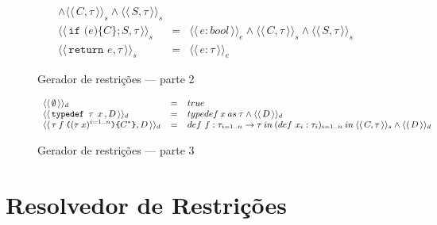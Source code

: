 \documentclass[a4paper,8pt]{article}
\newcommand{\constre}[1]{\ensuremath{\langle\langle\,#1\,\rangle\rangle_{e}}}
\newcommand{\constrc}[1]{\ensuremath{\langle\langle\,#1\,\rangle\rangle_{s}}}
\newcommand{\constrd}[1]{\ensuremath{\langle\langle\,#1\,\rangle\rangle_{d}}}
\begin{document}
\begin{figure}[h]
\[{\begin{array}{lcl}
                                                     \land
                                                     \constrc{C
                                                            , \tau}
                                                                \land \constrc{S,\tau}\\
             \constrc{\texttt{if (} e \texttt{)\{} C
             \texttt{\}} ; S , \tau} & = & \constre{e : bool}
                                                     \land
                                                     \constrc{C
                                       , \tau} \land \constrc{S,\tau}\\
             \constrc{\texttt{return }e, \tau} & = & \constre{e : \tau}
           \end{array}}
       \]
       \caption{Gerador de restrições --- parte 2}
     \end{figure}

     \begin{figure}[h]
       \[
         \small{
           \begin{array}{lcl}
               \constrd{\emptyset} & = & true \\
               \constrd{\texttt{typedef }\tau\:\:x\,,D} & = &
                                                             typedef\:x
                                                             \:as\:\tau
                                                             \land \constrd{D}\\
               \constrd{\tau\:f\:\texttt{(}(\tau\:x)^{i=1..n}\texttt{)}
             \texttt{\{}C^*\texttt{\}} , D} & = & def\,\,f :
                                                       \tau_{i =
                                                       1.. n}\to \tau
                                                       \:in\: 
                                                       (def\,\,x_i :
                                                       \tau_i)_{i
                                                       = 1..n}\: in\:
                                                       \constrc{C,\tau}
                                                       \land \constrd{D}
           \end{array}
         }
       \]
       \caption{Gerador de restrições --- parte 3}
     \end{figure}
     
     \section{Resolvedor de Restrições}\label{constraintsolver}
\end{document}
